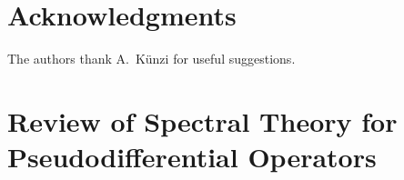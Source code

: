\documentclass[a4paper,12pt]{article}
\let\originalleft\left
\let\originalright\right
\renewcommand{\left}{\mathopen{}\mathclose\bgroup\originalleft}
\renewcommand{\right}{\aftergroup\egroup\originalright}
\newcommand{\diff}{\mathop{}\!d}
\newcommand{\symbolnotsobw}{\symbolnot_{\mathcal{W}}}
\newcommand{\symbolnot}{\sigma}
\begin{document}





\section*{Acknowledgments}

The authors thank A.~Künzi for useful suggestions.




\appendix


\section{Review of Spectral Theory for Pseudodifferential Operators}
\label{sec:review-lit}
\end{document}
